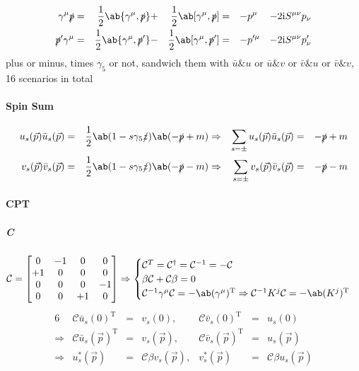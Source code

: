 \documentclass{article}
\newcommand{\bmat}[1]{\begin{bmatrix}#1\end{bmatrix}}
\newcommand{\calC}{\mathcal{C}}
\newcommand{\gammafive}{\gamma_5}
\newcommand{\gammamu}{\gamma^{\mu}}
\newcommand{\rmi}{\mathrm{i}}
\newcommand{\rmT}{\mathrm{T}}
\newcommand{\slashedp}{\slashed{p}}
\newcommand{\Smunu}{S^{\mu\nu}}
\newcommand{\vecp}{\vec{p}}
\begin{document}
\begin{framed}
    \begin{alignat*}{9}
        \gammamu \slashedp  & = & \frac{1}{2} \ab\{\gammamu, \slashedp\}  & + & \frac{1}{2} \ab[\gammamu, \slashedp]  & = & - & p^{\mu}  & - & 2 \rmi \Smunu p_{\nu}  \\
        \slashedp' \gammamu & = & \frac{1}{2} \ab\{\gammamu, \slashedp'\} & - & \frac{1}{2} \ab[\gammamu, \slashedp'] & = & - & p'^{\mu} & - & 2 \rmi \Smunu p'_{\nu}
    \end{alignat*}
    plus or minus, times $\gammafive$ or not, sandwich them with $\bar{u} \& u$ or $\bar{u} \& v$ or $\bar{v} \& u$ or $\bar{v} \& v$, 16 scenarios in total
\end{framed}

\paragraph{Spin Sum}

\begin{alignat*}{6}
    u_s(\vecp) \bar{u}_s(\vecp) & = & \frac{1}{2} \ab(1 - s \gammafive \slashed{z}) \ab(- \slashedp + m) & \Rightarrow & \sum_{s = \pm} u_s(\vecp) \bar{u}_s(\vecp) & = & - \slashedp + m \\
    v_s(\vecp) \bar{v}_s(\vecp) & = & \frac{1}{2} \ab(1 - s \gammafive \slashed{z}) \ab(- \slashedp - m) & \Rightarrow & \sum_{s = \pm} v_s(\vecp) \bar{v}_s(\vecp) & = & - \slashedp - m
\end{alignat*}

\paragraph{CPT}

\subparagraph{C}

\[ \calC = \bmat{0 & -1 & 0 & 0 \\ +1 & 0 & 0 & 0 \\ 0 & 0 & 0 & -1 \\ 0 & 0 & +1 & 0} \Rightarrow \begin{cases}
        \calC^{T} = \calC^{\dagger} = \calC^{-1} = - \calC \\
        \beta \calC + \calC \beta = 0                      \\
        \calC^{-1} \gammamu \calC = - \ab(\gammamu)^{\rmT} \Rightarrow \calC^{-1} K^{j} \calC = - \ab(K^{j})^{\rmT}
    \end{cases} \]
\begin{alignat*}{6}
                & \calC \bar{u}_s(0)^\rmT     & = & v_s(0),                 & \calC \bar{v}_s(0)^\rmT     & = & u_s(0)                 \\
    \Rightarrow & \calC \bar{u}_s(\vecp)^\rmT & = & v_s(\vecp),             & \calC \bar{v}_s(\vecp)^\rmT & = & u_s(\vecp)             \\
    \Rightarrow & u^*_s(\vecp)                & = & \calC \beta v_s(\vecp), & v^*_s(\vecp)                & = & \calC \beta u_s(\vecp)
\end{alignat*}
\end{document}
